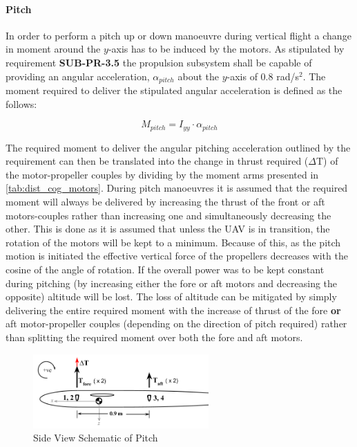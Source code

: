 \paragraph{Pitch}
In order to perform a pitch up or down manoeuvre during vertical flight a change in moment around the $y$-axis has to be induced by the motors. As stipulated by requirement \textbf{SUB-PR-3.5} the propulsion subsystem shall be capable of providing an angular acceleration, $\alpha_{pitch}$ about the $y$-axis of 0.8 rad/s$^2$. The moment required to deliver the stipulated angular acceleration is defined as the follows:

\begin{equation}
\label{eq:requ_mome_pitc}
M_{pitch} = I_{yy} \cdot \alpha_{pitch}
\end{equation}


The required moment to deliver the angular pitching acceleration outlined by the requirement can then be translated into the change in thrust required ($\Delta$T) of the motor-propeller couples by dividing by the moment arms presented in \autoref{tab:dist_cog_motors}. During pitch manoeuvres it is assumed that the required moment will always be delivered by increasing the thrust of the front or aft motors-couples rather than increasing one and simultaneously decreasing the other. This is done as it is assumed that unless the UAV is in transition, the rotation of the motors will be kept to a minimum. Because of this, as the pitch motion is initiated the effective vertical force of the propellers decreases with the cosine of the angle of rotation. If the overall power was to be kept constant during pitching (by increasing either the fore or aft motors and decreasing the opposite) altitude will be lost. The loss of altitude can be mitigated by simply delivering the entire required moment with the increase of thrust of the fore \textbf{or} aft motor-propeller couples (depending on the direction of pitch required) rather than splitting the required moment over both the fore and aft motors.

\begin{figure}[H]
    \centering
    \includegraphics[width=0.6\textwidth]{StabilityandControl/Figures/Side_view_control.png}
    \caption{Side View Schematic of Pitch}
    \label{fig:schematic_side}
\end{figure}

